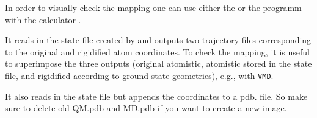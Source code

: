 In order to visually check the mapping one can use either the  \calculator or the programm \ctpdump with the calculator .

\label{sec:ctp_dump}

It reads in the state file created by \ctpmap and outputs two trajectory files corresponding to the original and rigidified atom coordinates. To check the mapping, it is useful to superimpose the three outputs (original atomistic, atomistic stored in the state file, and rigidified according to ground state geometries), e.g., with {\tt VMD}.

\label{sec:tdump}

It also reads in the state file but appends the coordinates to a pdb. file. So make sure to delete old QM.pdb and MD.pdb if you want to create a new image.



